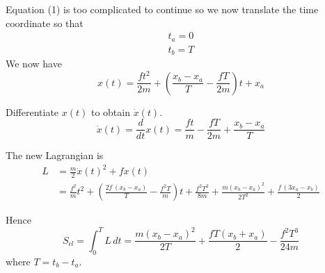 \documentclass[12pt]{article}
\begin{document}
Equation (1) is too complicated to continue so we now translate the time coordinate so that
\begin{align*}
t_a=0
\\
t_b=T
\end{align*}
We now have
\begin{equation*}
x(t)=\frac{ft^2}{2m}+\left(\frac{x_b-x_a}{T}-\frac{fT}{2m}\right)t+x_a
\tag{2}
\end{equation*}

Differentiate $x(t)$ to obtain $\dot x(t)$.
\begin{equation*}
\dot x(t)=
\frac{d}{dt}x(t)=\frac{ft}{m}-\frac{fT}{2m}+\frac{x_b-x_a}{T}
\tag{3}
\end{equation*}

The new Lagrangian is
{\footnotesize
\begin{align*}
L&=\frac{m}{2}\dot x(t)^2+fx(t)
\\[1ex]
&=\frac{f^2}{m}t^2
+\left(\frac{2f\,(x_b-x_a)}{T}-\frac{f^2T}{m}\right)t
+\frac{f^2T^2}{8m}
+\frac{m(x_b-x_a)^2}{2T^2}
+\frac{f\,(3x_a-x_b)}{2}
\tag{4}
\end{align*}
}

Hence
\begin{equation*}
S_{cl}=\int_0^T L\,dt
=\frac{m(x_b-x_a)^2}{2T}+\frac{fT(x_b+x_a)}{2}-\frac{f^2T^3}{24m}
\tag{5}
\end{equation*}
where $T=t_b-t_a$.
\end{document}
